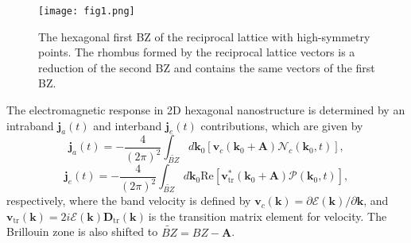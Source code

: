 \documentclass[reprint, superscriptaddress,  aps, pra]{revtex4-2}
\begin{document}
\begin{figure}[tbp]
\texttt{[image: fig1.png]}
\caption{The hexagonal first BZ of the reciprocal lattice with high-symmetry
points. The rhombus formed by the reciprocal lattice vectors is a reduction
of the second BZ and contains the same vectors of the first BZ.}
\end{figure}
The electromagnetic response in 2D hexagonal nanostructure is determined by
an intraband $\mathbf{j}_{a}\left( t\right) $ and interband $\mathbf{j}%
_{e}\left( t\right) $ contributions, which are given by 
\begin{equation}
\mathbf{j}_{a}\left( t\right) =-\frac{4}{(2\pi )^{2}}\int_{\widetilde{BZ}}d%
\mathbf{k}_{0}\left[ \mathbf{v}_{c}\left( \mathbf{k}_{0}+\mathbf{A}\right) 
\mathcal{N}_{c}\left( \mathbf{k}_{0},t\right) \right] ,  \label{ja}
\end{equation}%
\begin{equation}
\mathbf{j}_{e}\left( t\right) =-\frac{4}{(2\pi )^{2}}\int_{\widetilde{BZ}}d%
\mathbf{k}_{0}\mathrm{Re}\left[ \mathbf{v}_{\mathrm{tr}}^{\ast }\left( 
\mathbf{k}_{0}+\mathbf{A}\right) \mathcal{P}(\mathbf{k}_{0},t)\right] ,
\label{je}
\end{equation}%
respectively, where the band velocity is defined by $\mathbf{v}_{c}\left( 
\mathbf{k}\right) =\partial \mathcal{E}\left( \mathbf{k}\right) /\partial 
\mathbf{k}$, and $\mathbf{v}_{\mathrm{tr}}\left( \mathbf{k}\right) =2i%
\mathcal{E}\left( \mathbf{k}\right) \mathbf{D}_{\mathrm{tr}}\left( \mathbf{k}%
\right) \ $is the transition matrix element for velocity. The Brillouin zone
is also shifted to $\widetilde{BZ}=BZ-\mathbf{A}$.
\end{document}
